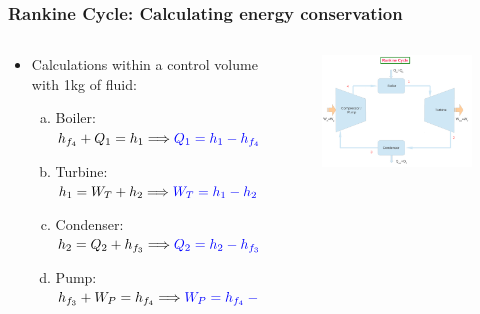 \documentclass[10pt,compress,handout,ignorenonframetext]{beamer}
\begin{document}
\begin{frame}
 \frametitle{Rankine Cycle: Calculating energy conservation}
  \begin{columns}
   \begin{column}[c]{0.4\linewidth}
    \begin{itemize}
     \item <1-> Calculations within a control volume with 1kg of fluid:
      \begin{enumerate}[(a)] %
       \item <2->Boiler:\\
        $h_{f_{4}} + Q_{1} = h_{1} \Longrightarrow \textcolor{blue}{Q_{1}=h_{1}-h_{f_{4}}}$
       \item <3->Turbine:\\
        $h_{1} = W_{T} +h_{2} \Longrightarrow \textcolor{blue}{W_{T} =h_{1}-h_{2}}$
       \item <4->Condenser:\\
        $h_{2}=Q_{2}+h_{f_{3}} \Longrightarrow \textcolor{blue}{Q_{2}=h_{2}-h_{f_{3}}}$
       \item <5->Pump:\\
        $h_{f_{3}}+W_{P}=h_{f_{4}} \Longrightarrow \textcolor{blue}{W_{P}=h_{f_{4}}-h_{f_{3}}}$
      \end{enumerate}
     \end{itemize}
    \end{column}
    \begin{column}[c]{0.6\linewidth}
     \begin{figure}%
      \begin{center}
       \includegraphics[width=6.5cm,clip]{./Pics/Simple_Rankine_Cycle}
      \end{center}
     \end{figure}
    \end{column}
   \end{columns}
 \normalsize
\end{frame}
\end{document}
